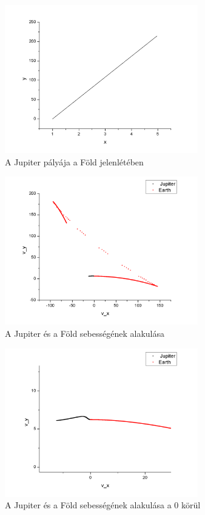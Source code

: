 \documentclass[paper=a4, fontsize=11pt]{article}
\begin{document}
\begin{figure}[H]
  \includegraphics[width=0.75\textwidth]{3testjupiter}
\caption{A Jupiter pályája a Föld jelenlétében}
\end{figure}

\begin{figure}[H]
  \includegraphics[width=0.75\textwidth]{3testjupitervtav}
\caption{A Jupiter és a Föld sebességének alakulása}
\end{figure}

\begin{figure}[H]
  \includegraphics[width=0.75\textwidth]{3testjupiterv}
\caption{A Jupiter és a Föld sebességének alakulása a 0 körül}
\end{figure}
\end{document}
